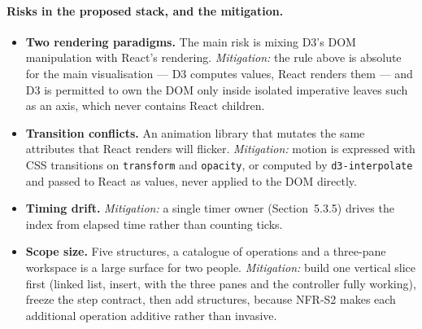 \documentclass[11pt,a4paper]{article}
\newcommand{\ct}[1]{\texttt{#1}}
\begin{document}
\paragraph{Risks in the proposed stack, and the mitigation.}
\begin{itemize}[leftmargin=1.6em,itemsep=2pt]
  \item \textbf{Two rendering paradigms.} The main risk is mixing D3's DOM manipulation with
        React's rendering. \emph{Mitigation:} the rule above is absolute for the main
        visualisation --- D3 computes values, React renders them --- and D3 is permitted to
        own the DOM only inside isolated imperative leaves such as an axis, which never
        contains React children.
  \item \textbf{Transition conflicts.} An animation library that mutates the same attributes
        that React renders will flicker. \emph{Mitigation:} motion is expressed with CSS
        transitions on \ct{transform} and \ct{opacity}, or computed by
        \ct{d3-interpolate} and passed to React as values, never applied to the DOM directly.
  \item \textbf{Timing drift.} \emph{Mitigation:} a single timer owner (Section~5.3.5) drives
        the index from elapsed time rather than counting ticks.
  \item \textbf{Scope size.} Five structures, a catalogue of operations and a three-pane
        workspace is a large surface for two people. \emph{Mitigation:} build one vertical
        slice first
        (linked list, insert, with the three panes and the controller fully working), freeze
        the step contract, then add structures, because NFR-S2 makes each additional
        operation additive rather than invasive.
\end{itemize}
\end{document}
